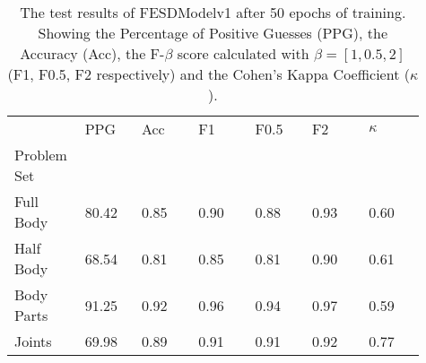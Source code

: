     \begin{table}[!htbp]
        \caption[Test Results of FESDModelv1]{The test results of FESDModelv1 after 50 epochs of training. Showing the Percentage of Positive Guesses (PPG), the Accuracy (Acc), the F-$\beta$ score calculated with $\beta = [1, 0.5, 2]$ (F1, F0.5, F2 respectively) and the Cohen's Kappa Coefficient ($\kappa$).}
        \label{tab:res_v1}
        \begin{tabular}{p{0.13\linewidth}p{0.13\linewidth}p{0.13\linewidth}p{0.13\linewidth}p{0.13\linewidth}p{0.13\linewidth}p{0.13\linewidth}}
\hline
{} &   PPG &  Acc &   F1 &  F0.5 &   F2 &  $\kappa$ \\
Problem Set   &       &      &      &       &      &           \\
\hline
Full Body  & 80.42 & 0.85 & 0.90 &  0.88 & 0.93 &      0.60 \\
Half Body  & 68.54 & 0.81 & 0.85 &  0.81 & 0.90 &      0.61 \\
Body Parts & 91.25 & 0.92 & 0.96 &  0.94 & 0.97 &      0.59 \\
Joints     & 69.98 & 0.89 & 0.91 &  0.91 & 0.92 &      0.77 \\
\hline
\end{tabular}

    \end{table}
  